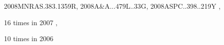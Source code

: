 \documentclass[12pt]{article}
\begin{document}
\begin{description}
{2008MNRAS.383.1359R,%
2008A&A...479L..33G,%
2008ASPC..398..219Y%
},\item
16 times in 2007 \citep{
2007AN....328.1118B,%
2007AN....328.1006K,%
2007A&A...476.1123F,%
2007A&A...476.1113F,%
2007ApJ...670..805O,%
2007ApJ...669.1390H,%
2007NJPh....9..305B,%
2007NJPh....9..300S,%
2007arXiv0708.3893J,%
2007arXiv0708.3890J,%
2007MNRAS.378..662R,%
2007ApJ...662..627J,%
2007ApJ...662..613Y,%
2007MNRAS.376.1238S,%
2007ApJ...654..945B,%
2007IAUS..237..183G%
},\item
10 times in 2006 \citep{
2006ApJ...653..558O,%
2006A&A...459..935H,%
}
\end{description}
\end{document}
